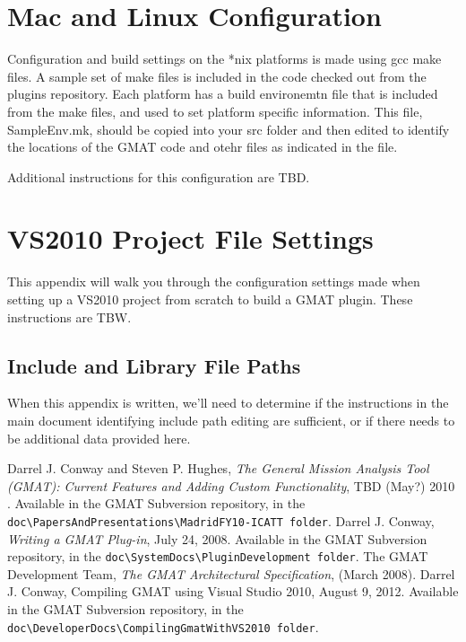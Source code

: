 \documentclass[10pt,letterpaper]{article}
\begin{document}
\appendix
\section{Mac and Linux Configuration}

Configuration and build settings on the *nix platforms is made using gcc make files.  A sample set of make files is included in the code checked out from the plugins repository.  Each platform has a build environemtn file that is included from the make files, and used to set platform specific information.  This file, SampleEnv.mk, should be copied into your src folder and then edited to identify the locations of the GMAT code and otehr files as indicated in the file.

Additional instructions for this configuration are TBD.

\section{\label{settings}VS2010 Project File Settings}

This appendix will walk you through the configuration settings made when setting up a VS2010 project from scratch to build a GMAT plugin.  These instructions are TBW.

\subsection{Include and Library File Paths}

When this appendix is written, we'll need to determine if the instructions in the main document identifying include path editing are sufficient, or if there needs to be additional data provided here.

\begin{thebibliography}{}
Darrel J. Conway and Steven P. Hughes, \textit{The General Mission Analysis Tool (GMAT): Current Features and Adding Custom Functionality}, TBD (May?) 2010 . Available in the GMAT Subversion repository, in the \texttt{doc{\textbackslash}PapersAndPresentations{\textbackslash}MadridFY10-ICATT folder}.
Darrel J. Conway, \textit{Writing a GMAT Plug-in}, July 24, 2008. Available in the GMAT Subversion repository, in the \texttt{doc{\textbackslash}SystemDocs{\textbackslash}PluginDevelopment folder}.
 The GMAT Development Team, \textit{The GMAT Architectural Specification}, (March 2008). 
Darrel J. Conway, Compiling GMAT using Visual Studio 2010, August 9, 2012. Available in the GMAT Subversion repository, in the \texttt{doc{\textbackslash}DeveloperDocs{\textbackslash}CompilingGmatWithVS2010 folder}.

\end{thebibliography}
\end{document}
